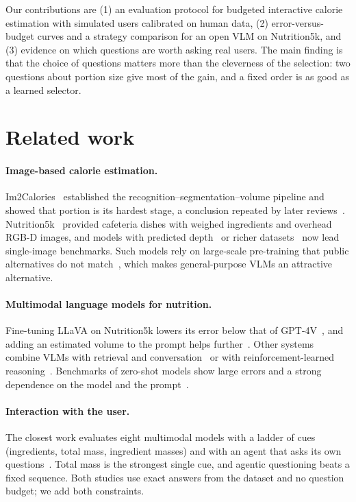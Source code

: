 \documentclass[twocolumn]{svjour3}
\begin{document}
Our contributions are (1) an evaluation protocol for budgeted interactive calorie estimation with
simulated users calibrated on human data, (2) error-versus-budget curves and a strategy comparison for an
open VLM on Nutrition5k, and (3) evidence on which questions are worth asking real users. The main finding
is that the choice of questions matters more than the cleverness of the selection: two questions about
portion size give most of the gain, and a fixed order is as good as a learned selector.

\section{Related work}
\label{sec:related}

\paragraph{Image-based calorie estimation.}
Im2Calories~\cite{meyers2015im2calories} established the recognition--segmentation--volume pipeline and
showed that portion is its hardest stage, a conclusion repeated by later reviews~\cite{lo2020review,vinod2026portion}.
Nutrition5k~\cite{thames2021nutrition5k} provided cafeteria dishes with weighed ingredients and overhead
RGB-D images, and models with predicted depth~\cite{han2023dpf} or richer datasets~\cite{yu2026omnifood8k}
now lead single-image benchmarks. Such models rely on large-scale pre-training that public alternatives do
not match~\cite{andrade2025pretraining}, which makes general-purpose VLMs an attractive alternative.

\paragraph{Multimodal language models for nutrition.}
Fine-tuning LLaVA on Nutrition5k lowers its error below that of GPT-4V~\cite{tanabe2024calorielava}, and
adding an estimated volume to the prompt helps further~\cite{tanabe2025calorievol}. Other systems combine
VLMs with retrieval and conversation~\cite{yao2024caloraify} or with reinforcement-learned
reasoning~\cite{zhu2026foodr1}. Benchmarks of zero-shot models show large errors and a strong dependence on
the model and the prompt~\cite{fridolfsson2025llm,coburn2025lmm,nutrients2026prompt}.

\paragraph{Interaction with the user.}
The closest work evaluates eight multimodal models with a ladder of cues (ingredients, total mass,
ingredient masses) and with an agent that asks its own questions~\cite{bhatambarekar2025thesis,bhatambarekar2026agentic}.
Total mass is the strongest single cue, and agentic questioning beats a fixed sequence. Both studies use
exact answers from the dataset and no question budget; we add both constraints.
\end{document}
